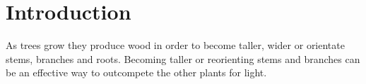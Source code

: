 \chapter{Introduction}
As trees grow they produce wood in order to become taller, wider or orientate
stems, branches and roots. Becoming taller or reorienting stems and branches can
be an effective way to outcompete the other plants for light.